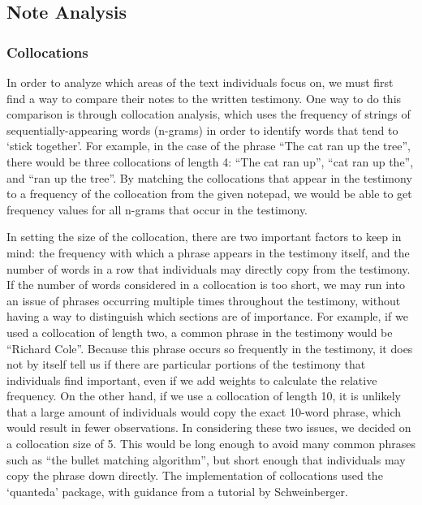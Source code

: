 \documentclass[print]{nuthesis}
\begin{document}
\hypertarget{note-analysis}{%
\subsection{Note Analysis}\label{note-analysis}}

\hypertarget{collocations}{%
\subsubsection{Collocations}\label{collocations}}

In order to analyze which areas of the text individuals focus on, we must first find a way to compare their notes to the written testimony.
One way to do this comparison is through collocation analysis, which uses the frequency of strings of sequentially-appearing words (n-grams) in order to identify words that tend to `stick together'.
For example, in the case of the phrase ``The cat ran up the tree'', there would be three collocations of length 4: ``The cat ran up'', ``cat ran up the'', and ``ran up the tree''.
By matching the collocations that appear in the testimony to a frequency of the collocation from the given notepad, we would be able to get frequency values for all n-grams that occur in the testimony.

In setting the size of the collocation, there are two important factors to keep in mind: the frequency with which a phrase appears in the testimony itself, and the number of words in a row that individuals may directly copy from the testimony.
If the number of words considered in a collocation is too short, we may run into an issue of phrases occurring multiple times throughout the testimony, without having a way to distinguish which sections are of importance.
For example, if we used a collocation of length two, a common phrase in the testimony would be ``Richard Cole''.
Because this phrase occurs so frequently in the testimony, it does not by itself tell us if there are particular portions of the testimony that individuals find important, even if we add weights to calculate the relative frequency.
On the other hand, if we use a collocation of length 10, it is unlikely that a large amount of individuals would copy the exact 10-word phrase, which would result in fewer observations.
In considering these two issues, we decided on a collocation size of 5.
This would be long enough to avoid many common phrases such as ``the bullet matching algorithm'', but short enough that individuals may copy the phrase down directly.
The implementation of collocations used the `quanteda' package, with guidance from a tutorial by Schweinberger.
\end{document}
